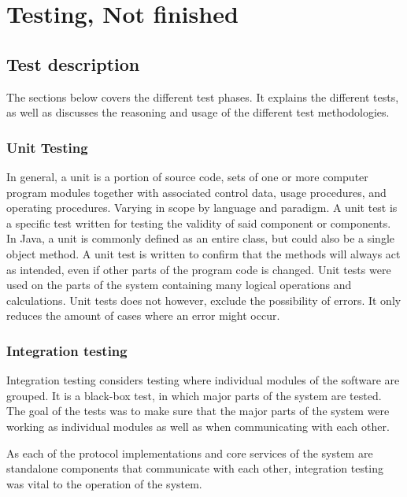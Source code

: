 
\chapter{Testing, Not finished}
\label{ch:testing}

\section{Test description}
\label{sec:testing-test_description}

The sections below covers the different test phases. It explains the different tests, as well as discusses the reasoning and usage of the different test methodologies.

\subsection{Unit Testing}
\label{subsec:testing-test_description-unit_testing}

In general, a unit is a portion of source code, sets of one or more computer program modules together with associated control data, usage procedures, and operating procedures. Varying in scope by language and paradigm. A unit test is a specific test written for testing the validity of said component or components. In Java, a unit is commonly defined as an entire class, but could also be a single object method. A unit test is written to confirm that the methods will always act as intended, even if other parts of the program code is changed. Unit tests were used on the parts of the system containing many logical operations and calculations. Unit tests does not however, exclude the possibility of errors. It only reduces the amount of cases where an error might occur.

\subsection{Integration testing}
\label{subsec:testing-test_description-integration_testing}

Integration testing considers testing where individual modules of the software are grouped. It is a black-box test, in which major parts of the system are tested. The goal of the tests was to make sure that the major parts of the system were working as individual modules as well as when communicating with each other.

As each of the protocol implementations and core services of the system are standalone components that communicate with each other, integration testing was vital to the operation of the system.

